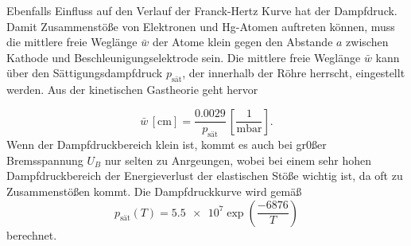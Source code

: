 Ebenfalls Einfluss auf den Verlauf der Franck-Hertz Kurve hat der Dampfdruck. Damit Zusammenstöße von Elektronen und Hg-Atomen 
auftreten können, muss die mittlere freie Weglänge $\bar{w}$ der Atome klein gegen den Abstande $a$ zwischen Kathode und Beschleunigungselektrode
sein. Die mittlere freie Weglänge $\bar{w}$ kann über den Sättigungsdampfdruck $p_{\text{sät}}$, der innerhalb der Röhre herrscht,
eingestellt werden. Aus der kinetischen Gastheorie geht hervor

\begin{equation}
    \bar{w} \, \left[\unit{\centi\meter}\right] = \frac{0.0029}{p_{\text{sät}}} \, \left[ \frac{1}{\unit{\milli\bar}}\right].
    \label{eqn:dampf1}
\end{equation}
Wenn der Dampfdruckbereich klein ist, kommt es auch bei gr0ßer Bremsspannung $U_B$ nur selten zu Anrgeungen, wobei bei einem 
sehr hohen Dampfdruckbereich der Energieverlust der elastischen Stöße wichtig ist, da oft zu Zusammenstößen kommt.
Die Dampfdruckkurve wird gemäß
\begin{equation}
    p_{\text{sät}} (T) = \num{5.5e7} \exp{\left( \frac{-6876}{T} \right)} 
    \label{eqn:dampf2}
\end{equation}
berechnet.